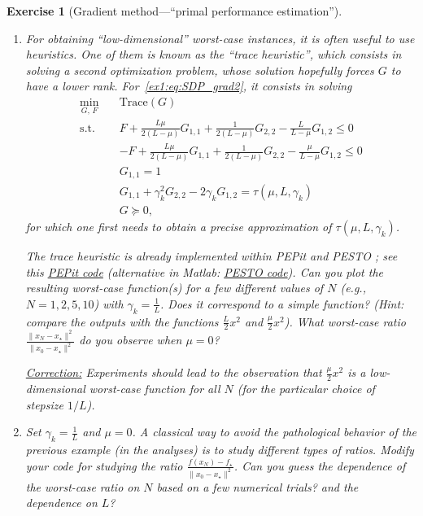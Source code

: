 \documentclass[11pt,a4paper]{article}
\newcommand{\pesto}{{PESTO }}
\newcommand{\pepit}{{PEPit }}
\newcommand{\correction}[1]{{{\color{blue}\underline{Correction:} #1}}}
\newcommand{\correction}[1]{}
\newtheorem{exercise}{Exercise}
\begin{document}
\begin{exercise}[Gradient method---``primal performance estimation'']
\begin{enumerate}
	\item For obtaining ``low-dimensional'' worst-case instances, it is often useful to use heuristics. One of them is known as the ``trace heuristic'', which consists in solving a second optimization problem, whose solution hopefully forces $G$ to have a lower rank. For~\eqref{ex1:eq:SDP_grad2}, it consists in solving
	\begin{equation}\label{ex1:eq:trace}
	\begin{aligned}
				\min_{G,\, F} \quad & \mathrm{Trace}(G)\\
			\text{s.t. } \quad & F + \tfrac{L\mu}{2(L-\mu)} G_{1,1}+\tfrac{1}{2(L-\mu)}G_{2,2}-\tfrac{L}{L-\mu}G_{1,2}\leqslant 0\\
			&-F + \tfrac{L\mu}{2(L-\mu)} G_{1,1}+\tfrac{1}{2(L-\mu)}G_{2,2}-\tfrac{\mu}{L-\mu}G_{1,2}\leqslant 0\\
			&G_{1,1}= 1\\
			&G_{1,1}+\gamma_k ^2 G_{2,2}-2\gamma_k G_{1,2}=\tau(\mu,L,\gamma_k)\\
			&G\succcurlyeq 0,
	\end{aligned}
	\end{equation}
	for which one first needs to obtain a precise approximation of $\tau(\mu,L,\gamma_k)$. 
	
	The trace heuristic is already implemented within \pepit and \pesto; see this \href{https://github.com/PerformanceEstimation/Learning-Performance-Estimation/tree/main/Exercises - codes/Jupyter/Exercise1.ipynb}{\pepit code} (alternative in Matlab: \href{https://github.com/PerformanceEstimation/Learning-Performance-Estimation/blob/main/Exercises - codes/Matlab/Exercise1_dimReduction.m}{\pesto code}). Can you plot the resulting worst-case function(s) for a few different values of $N$ (e.g., $N=1,2,5,10$) with $\gamma_k=\tfrac{1}{L}$. Does it correspond to a simple function? (Hint: compare the outputs with the functions $\tfrac{L}{2}x^2$ and $\tfrac{\mu}{2}x^2$). What worst-case ratio $\frac{\|x_{N}-x_\star\|^2}{\|x_0-x_\star\|^2}$ do you observe when $\mu=0$?
	
	\correction{Experiments should lead to the observation that $\tfrac{\mu}{2}x^2$ is a low-dimensional worst-case function for all $N$ (for the particular choice of stepsize $1/L$).}

	\item Set $\gamma_k=\tfrac{1}{L}$ and $\mu=0$. A classical way to avoid the pathological behavior of the previous example (in the analyses) is to study different types of ratios. Modify your code for studying the ratio $\frac{f(x_N)-f_\star}{\|x_0-x_\star\|^2}$. Can you guess the dependence of the worst-case ratio on $N$ based on a few numerical trials? and the dependence on $L$?
	

\end{enumerate}
\end{exercise}
\end{document}
